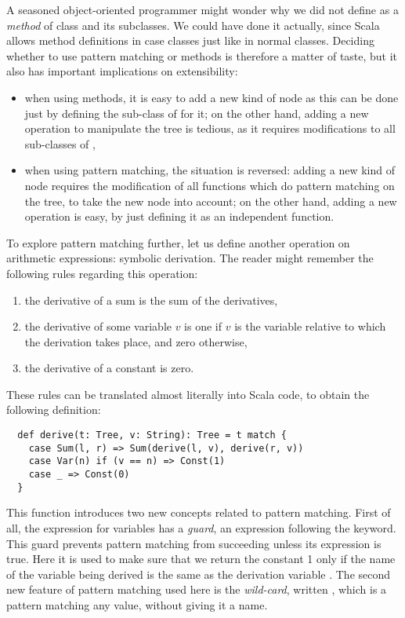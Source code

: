 \documentclass[a4paper,12pt,twoside,titlepage]{article}
\newcommand{\langname}[1]{#1\xspace}
\newcommand{\Scala}{\langname{Scala}}
\begin{document}
A seasoned object-oriented programmer might wonder why we did not
define  as a \emph{method} of class  and its
subclasses. We could have done it actually, since \Scala allows method
definitions in case classes just like in normal classes. Deciding
whether to use pattern matching or methods is therefore a matter of
taste, but it also has important implications on extensibility:
\begin{itemize}
\item when using methods, it is easy to add a new kind of node as this
  can be done just by defining the sub-class of  for it; on
  the other hand, adding a new operation to manipulate the tree is
  tedious, as it requires modifications to all sub-classes of
  ,
\item when using pattern matching, the situation is reversed: adding a
  new kind of node requires the modification of all functions which do
  pattern matching on the tree, to take the new node into account; on
  the other hand, adding a new operation is easy, by just defining it
  as an independent function.
\end{itemize}

To explore pattern matching further, let us define another operation
on arithmetic expressions: symbolic derivation. The reader might
remember the following rules regarding this operation:
\begin{enumerate}
\item the derivative of a sum is the sum of the derivatives,
\item the derivative of some variable $v$ is one if $v$ is the
  variable relative to which the derivation takes place, and zero
  otherwise,
\item the derivative of a constant is zero.
\end{enumerate}
These rules can be translated almost literally into \Scala code, to
obtain the following definition:
\begin{lstlisting}
  def derive(t: Tree, v: String): Tree = t match {
    case Sum(l, r) => Sum(derive(l, v), derive(r, v))
    case Var(n) if (v == n) => Const(1)
    case _ => Const(0)
  }
\end{lstlisting}%
This function introduces two new concepts related to pattern matching.
First of all, the  expression for variables has a
\emph{guard}, an expression following the  keyword. This
guard prevents pattern matching from succeeding unless its expression
is true. Here it is used to make sure that we return the constant 1
only if the name of the variable being derived is the same as the
derivation variable . The second new feature of pattern
matching used here is the \emph{wild-card}, written \code{_}, which is
a pattern matching any value, without giving it a name.
\end{document}
